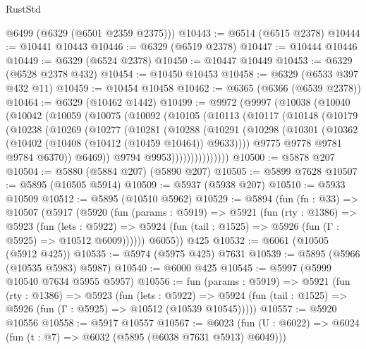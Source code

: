 \begin{lexlean}{RustStd}
\begin{coremodule}
{\begin{coremodule}
{{{{{{{{{{{{{{{{{{{{{{{{{{{{{{{{{{{      @6499
      (@6329 (@6501 @2359 @2375)))
@10443 := @6514 (@6515 @2378)
@10444 := @10441 @10443
@10446 := @6329 (@6519 @2378)
@10447 := @10444 @10446
@10449 := @6329 (@6524 @2378)
@10450 := @10447 @10449
@10453 := @6329 (@6528 @2378 @432)
@10454 := @10450 @10453
@10458 := @6329 (@6533 @397 @432 @11)
@10459 := @10454 @10458
@10462 := @6365 (@6366 (@6539 @2378))
@10464 := @6329 (@10462 @1442)
@10499 := @9972
    (@9997
      (@10038
        (@10040
          (@10042
            (@10059
              (@10075
                (@10092
                  (@10105
                    (@10113
                      (@10117
                        (@10148
                          (@10179
                            (@10238
                              (@10269
                                (@10277
                                  (@10281
                                    (@10288
                                      (@10291
                                        (@10298
                                          (@10301
                                            (@10362
                                              (@10402 (@10408 (@10412 (@10459 @10464)) @9633))))
                                          @9775
                                          @9778
                                          @9781
                                          @9784
                                          @6370))
                                      @6469))
                                  @9794
                                  @9953)))))))))))))))
@10500 := @5878 @207
@10504 := @5880 (@5884 @207) (@5890 @207)
@10505 := @5899 @7628
@10507 := @5895 (@10505 @5914)
@10509 := @5937 (@5938 @207)
@10510 := @5933 @10509
@10512 := @5895 (@10510 @5962)
@10529 := @5894
    (fun (fn : @33) =>
    @10507
      (@5917
        (@5920
          (fun (params : @5919) =>
          @5921
            (fun (rty : @1386) =>
            @5923
              (fun (lets : @5922) =>
              @5924 (fun (tail : @1525) => @5926 (fun (Γ : @5925) => @10512 @6009))))))
        @6055))
    @425
@10532 := @6061 (@10505 (@5912 @425))
@10535 := @5974 (@5975 @425) @7631
@10539 := @5895 (@5966 (@10535 @5983) @5987)
@10540 := @6000 @425
@10545 := @5997 (@5999 @10540 @7634 @5955 @5957)
@10556 := fun (params : @5919) =>
  @5921
    (fun (rty : @1386) =>
    @5923
      (fun (lets : @5922) =>
      @5924 (fun (tail : @1525) => @5926 (fun (Γ : @5925) => @10512 (@10539 @10545)))))
@10557 := @5920 @10556
@10558 := @5917 @10557
@10567 := @6023 (fun (U : @6022) => @6024 (fun (t : @7) => @6032 (@5895 (@6038 @7631 @5913) @6049)))
}}}}}}}}}}}}}}}}}}}}}}}}}}}}}}}}}}}
\end{coremodule}}
\end{coremodule}
\end{lexlean}
